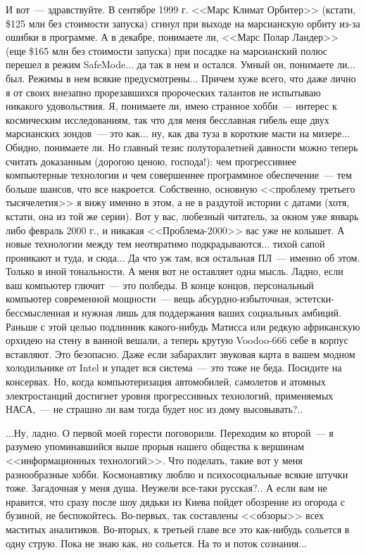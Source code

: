 \documentclass{scrbook}
\newcommand{\flqq}{<<}
\newcommand{\frqq}{>>}
\newcommand{\mdash}{~--- }
\newcommand{\commamdash}{~--- } %
\begin{document}
И вот{\mdash}здравствуйте. В сентябре 1999 г. {\flqq}Марс Климат Орбитер{\frqq} (кстати, \$125 млн без стоимости запуска) сгинул при выходе на марсианскую орбиту из-за ошибки в программе. А в декабре, понимаете ли, {\flqq}Марс Полар Ландер{\frqq} (еще \$165 млн без стоимости запуска) при посадке на марсианский полюс перешел в режим SafeMode... да так в нем и остался. Умный он, понимаете ли... был. Режимы в нем всякие предусмотрены... Причем хуже всего, что даже лично я от своих внезапно прорезавшихся пророческих талантов не испытываю никакого удовольствия. Я, понимаете ли, имею странное хобби{\mdash}интерес к космическим исследованиям, так что для меня бесславная гибель еще двух марсианских зондов{\mdash}это как... ну, как два туза в короткие масти на мизере... Обидно, понимаете ли. Но главный тезис полуторалетней давности можно теперь считать доказанным (дорогою ценою, господа!): чем прогрессивнее компьютерные технологии и чем совершеннее программное обеспечение{\mdash}тем больше шансов, что все накроется. Собственно, основную {\flqq}проблему третьего тысячелетия{\frqq} я вижу именно в этом, а не в раздутой истории с датами (хотя, кстати, она из той же серии). Вот у вас, любезный читатель, за окном уже январь либо февраль 2000 г., и никакая {\flqq}Проблема-2000{\frqq} вас уже не колышет. А новые технологии между тем неотвратимо подкрадываются... тихой сапой проникают и туда, и сюда... Да что уж там, вся остальная ПЛ{\mdash}именно об этом. Только в иной тональности. А меня вот не оставляет одна мысль. Ладно, если ваш компьютер глючит{\mdash}это полбеды. В конце концов, персональный компьютер современной мощности{\mdash}вещь абсурдно-избыточная, эстетски-бессмысленная и нужная лишь для поддержания ваших социальных амбиций. Раньше с этой целью подлинник какого-нибудь Матисса или редкую африканскую орхидею на стену в ванной вешали, а теперь крутую Voodoo-666 себе в корпус вставляют. Это безопасно. Даже если забарахлит звуковая карта в вашем модном холодильнике от Intel и упадет вся система{\mdash}это тоже не беда. Посидите на консервах. Но, когда компьютеризация автомобилей, самолетов и атомных электростанций достигнет уровня прогрессивных технологий, применяемых НАСА,{\commamdash}не страшно ли вам тогда будет нос из дому высовывать?..

...Ну, ладно. О первой моей горести поговорили. Переходим ко второй{\mdash}я разумею упоминавшийся выше прорыв нашего общества к вершинам {\flqq}информационных технологий{\frqq}. Что поделать, такие вот у меня разнообразные хобби. Космонавтику люблю и психосоциальные всякие штучки тоже. Загадочная у меня душа. Неужели все-таки русская?..
А если вам не нравится, что сразу после шоу дядьки из Киева пойдет обозрение из огорода с бузиной, не беспокойтесь. Во-первых, так составлены {\flqq}обзоры{\frqq} всех маститых аналитиков. Во-вторых, к третьей главе все это как-нибудь сольется в одну струю. Пока не знаю как, но сольется. На то и поток сознания...
\end{document}
